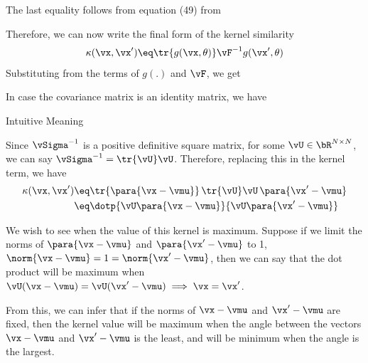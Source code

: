 \documentclass{article}
\begin{document}
\begin{question}
	The last equality follows from equation (49) from \cite{matrix-cookbook}

	Therefore, we can now write the final form of the kernel similarity
	\begin{align*}
		\kappa(\vx, \vx')	\eq	\tr{g(\vx, \theta)} \vF^{-1} g(\vx', \theta)
	\end{align*}
	Substituting from the terms of $g(.)$ and $\vF$, we get

	In case the covariance matrix is an identity matrix, we have

	\begin{qsubsection}{Intuitive Meaning}

		Since $\vSigma^{-1}$ is a positive definitive square matrix, for some $\vU \in \bR^{N \times N}$, we can say $\vSigma^{-1} = \tr{\vU} \vU$. Therefore, replacing this in the kernel term, we have
		\begin{align*}
			\kappa(\vx, \vx')	&\eq	\tr{\para{\vx - \vmu}}\,\tr{\vU} \vU\,\para{\vx' - \vmu} \\
			&\eq	\dotp{\vU \para{\vx - \vmu}}{\vU \para{\vx' - \vmu}}
		\end{align*}

		We wish to see when the value of this kernel is maximum. Suppose if we limit the norms of $\para{\vx - \vmu}$ and $\para{\vx' - \vmu}$ to 1, \ie $\norm{\vx - \vmu} = 1 = \norm{\vx' - \vmu}$, then we can say that the dot product will be maximum when $\vU (\vx - \vmu) = \vU (\vx' - \vmu) \implies \vx = \vx'$.

		From this, we can infer that if the norms of $\vx - \vmu$ and $\vx' - \vmu$ are fixed, then the kernel value will be maximum when the angle between the vectors $\vx - \vmu$ and $\vx' - \vmu$ is the least, and will be minimum when the angle is the largest.

	\end{qsubsection}

\end{question}
\end{document}
